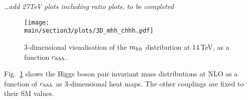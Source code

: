 {\it \ldots add 27TeV plots including ratio plots, to be completed}

\begin{figure}[ht]
\begin{center}
  \texttt{[image: \\main/section3/plots/3D\_mhh\_chhh.pdf]}    
\end{center}
\caption{3-dimensional visualisation of the $m_{hh}$ distribution at
  14\,TeV, as a function  $c_{hhh}$.}
\label{fig:chhh_3D}
\end{figure}
Fig.~\ref{fig:chhh_3D} shows the Higgs boson pair invariant mass
distributions at NLO as a function of $c_{hhh}$  as 3-dimensional heat maps.
The other couplings are fixed to their SM values.
 
%


